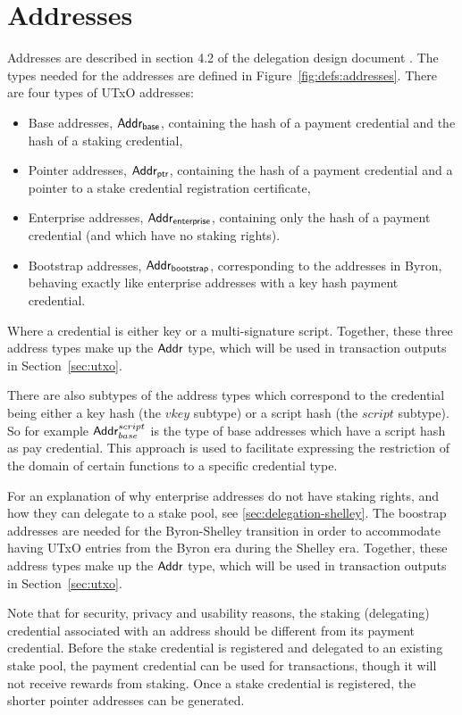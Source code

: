 \section{Addresses}
\label{sec:addresses}

Addresses are described in section 4.2 of the delegation design document \cite{delegation_design}.
The types needed for the addresses are defined in Figure~\ref{fig:defs:addresses}.
There are four types of UTxO addresses:
\begin{itemize}
\item Base addresses, $\mathsf{Addr_{base}}$, containing the hash of a payment credential and
  the hash of a staking credential,
\item Pointer addresses, $\mathsf{Addr_{ptr}}$, containing the hash of a payment credential
  and a pointer to a stake credential registration certificate,
\item Enterprise addresses, $\mathsf{Addr_{enterprise}}$,
  containing only the hash of a payment credential (and which have no staking rights).
\item Bootstrap addresses, $\mathsf{Addr_{bootstrap}}$, corresponding to the addresses in
  Byron, behaving exactly like enterprise addresses with a key hash
  payment credential.
\end{itemize}

\noindent Where a credential is either key or a multi-signature script. Together, these
three address types make up the $\mathsf{Addr}$ type, which will be used in transaction
outputs in Section~\ref{sec:utxo}.

There are also subtypes of the address types which correspond to the credential
being either a key hash (the $vkey$ subtype) or a script hash (the $script$
subtype). So for example $\mathsf{Addr}_{base}^{script}$ is the type of base addresses
which have a script hash as pay credential. This approach is used to facilitate
expressing the restriction of the domain of certain functions to a specific
credential type.

For an explanation of why enterprise addresses do not have staking rights,
and how they can delegate to a stake pool, see \ref{sec:delegation-shelley}.
The boostrap addresses are needed for the Byron-Shelley transition in order to
accommodate having UTxO entries from the Byron era during the Shelley era.
Together, these address types make up the $\mathsf{Addr}$ type, which will be used
in transaction outputs in Section~\ref{sec:utxo}.

Note that for security, privacy and usability reasons, the staking (delegating)
credential associated with an address should be different from its payment
credential.  Before the stake credential is registered and delegated to an
existing stake pool, the payment credential can be used for transactions, though
it will not receive rewards from staking.  Once a stake credential is
registered, the shorter pointer addresses can be generated.


